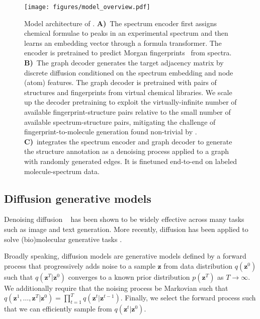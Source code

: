 

\begin{figure*}
    \centering
    \texttt{[image: figures/model\_overview.pdf]}
    \caption{Model architecture of \ours. \textbf{A)}~The spectrum encoder first assigns chemical formulae to peaks in an experimental spectrum and then learns an embedding vector through a formula transformer. The encoder is pretrained to predict Morgan fingerprints~\citep{morgan1965generation} from spectra. \textbf{B)}~The graph decoder generates the target adjacency matrix by discrete diffusion conditioned on the spectrum embedding and node (atom) features. The graph decoder is pretrained with pairs of structures and fingerprints from virtual chemical libraries. We scale up the decoder pretraining to exploit the virtually-infinite number of available fingerprint-structure pairs relative to the small number of available spectrum-structure pairs, mitigating the challenge of fingerprint-to-molecule generation found non-trivial by \citet{le2020neuraldecipher}. \textbf{C)}~\ours integrates the spectrum encoder and graph decoder to generate the structure annotation as a denoising process applied to a graph with randomly generated edges. It is finetuned end-to-end on labeled molecule-spectrum data.} %
    \label{fig:model-overview}
\end{figure*}



\subsection{Diffusion generative models}
Denoising diffusion ~\citep{pmlr-v37-sohl-dickstein15, ho2020denoisingdiffusionprobabilisticmodels} has been shown to be widely effective across many tasks such as image \citep{song2020score, saharia2022photorealistic, karras2022elucidating} and text \citep{li2022diffusion, austin2023structureddenoisingdiffusionmodels} generation. More recently, diffusion has been applied to solve (bio)molecular generative tasks 
\citep{corso2023diffdockdiffusionstepstwists, Watson2023DeND, zeni2024mattergengenerativemodelinorganic}. 

Broadly speaking, diffusion models are generative models defined by a forward process that progressively adds noise to a sample $\bm{z}$ from data distribution $q(\bm{z}^0)$ such that $q(\bm{z}^T | \bm{z}^0)$ converges to a known prior distribution $p(\bm{z}^T)$ as $T \to \infty$. We additionally require that the noising process be Markovian such that $q(\bm{z}^1, \dots, \bm{z}^T | \bm{z}^0) = \prod_{t=1}^Tq(\bm{z}^t | \bm{z}^{t-1})$. Finally, we select the forward process such that we can efficiently sample from $q(\bm{z}^t | \bm{z}^0)$.

